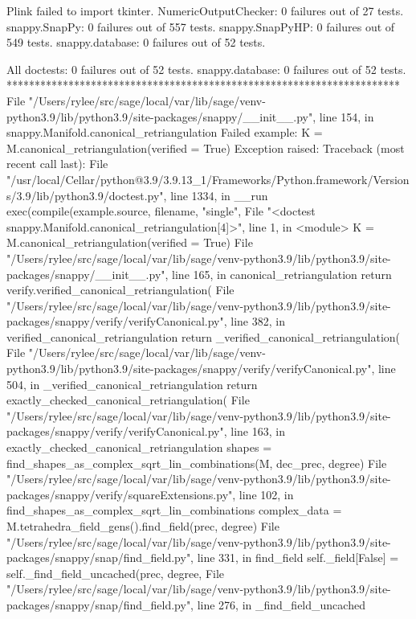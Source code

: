 Plink failed to import tkinter.
NumericOutputChecker:
   0 failures out of 27 tests.
snappy.SnapPy:
   0 failures out of 557 tests.
snappy.SnapPyHP:
   0 failures out of 549 tests.
snappy.database:
   0 failures out of 52 tests.

All doctests:
   0 failures out of 52 tests.
snappy.database:
   0 failures out of 52 tests.
**********************************************************************
File "/Users/rylee/src/sage/local/var/lib/sage/venv-python3.9/lib/python3.9/site-packages/snappy/__init__.py", line 154, in snappy.Manifold.canonical_retriangulation
Failed example:
    K = M.canonical_retriangulation(verified = True)
Exception raised:
    Traceback (most recent call last):
      File "/usr/local/Cellar/python@3.9/3.9.13_1/Frameworks/Python.framework/Versions/3.9/lib/python3.9/doctest.py", line 1334, in __run
        exec(compile(example.source, filename, "single",
      File "<doctest snappy.Manifold.canonical_retriangulation[4]>", line 1, in <module>
        K = M.canonical_retriangulation(verified = True)
      File "/Users/rylee/src/sage/local/var/lib/sage/venv-python3.9/lib/python3.9/site-packages/snappy/__init__.py", line 165, in canonical_retriangulation
        return verify.verified_canonical_retriangulation(
      File "/Users/rylee/src/sage/local/var/lib/sage/venv-python3.9/lib/python3.9/site-packages/snappy/verify/verifyCanonical.py", line 382, in verified_canonical_retriangulation
        return _verified_canonical_retriangulation(
      File "/Users/rylee/src/sage/local/var/lib/sage/venv-python3.9/lib/python3.9/site-packages/snappy/verify/verifyCanonical.py", line 504, in _verified_canonical_retriangulation
        return exactly_checked_canonical_retriangulation(
      File "/Users/rylee/src/sage/local/var/lib/sage/venv-python3.9/lib/python3.9/site-packages/snappy/verify/verifyCanonical.py", line 163, in exactly_checked_canonical_retriangulation
        shapes = find_shapes_as_complex_sqrt_lin_combinations(M, dec_prec, degree)
      File "/Users/rylee/src/sage/local/var/lib/sage/venv-python3.9/lib/python3.9/site-packages/snappy/verify/squareExtensions.py", line 102, in find_shapes_as_complex_sqrt_lin_combinations
        complex_data = M.tetrahedra_field_gens().find_field(prec, degree)
      File "/Users/rylee/src/sage/local/var/lib/sage/venv-python3.9/lib/python3.9/site-packages/snappy/snap/find_field.py", line 331, in find_field
        self._field[False] = self._find_field_uncached(prec, degree,
      File "/Users/rylee/src/sage/local/var/lib/sage/venv-python3.9/lib/python3.9/site-packages/snappy/snap/find_field.py", line 276, in _find_field_uncached

